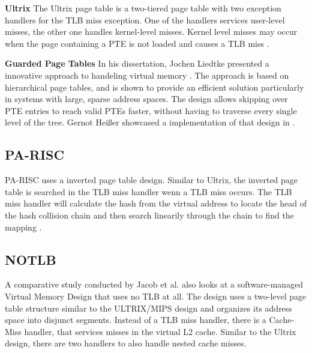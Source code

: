 \textbf{Ultrix} The Ultrix page table is a two-tiered page table with two exception handlers for the TLB miss exception.
One of the handlers services user-level misses, the other one handles kernel-level misses.
Kernel level misses may occur when the page containing a PTE is not loaded and causes a
TLB miss \cite{jacob1998look}.

\textbf{Guarded Page Tables} In his dissertation, Jochen Liedtke presented a innovative approach
to handeling virtual memory \cite{liedtkeGPT}.
The approach is based on hierarchical page tables, and is shown to provide an efficient solution particularly in systems with large, sparse address spaces.
The design allows skipping over PTE entries to reach valid PTEs faster, without having to traverse every single level of the tree.
Gernot Heißer showcased a implementation of that design in \cite{heiserAnatomyHighPerformanceMicrokernel}.

\subsection{PA-RISC}
PA-RISC uses a inverted page table design. Similar to Ultrix, the inverted page table is searched in the TLB miss handler wenn a TLB miss occurs.
The TLB miss handler will calculate the hash from the virtual address to locate the head of the hash collision chain and then search linearily through the chain to find the mapping \cite{jacob1998look}.

\subsection{NOTLB}
A comparative study conducted by Jacob et al. \cite{jacob1998look} also looks at a software-managed Virtual Memory Design that uses no TLB at all.
The design uses a two-level page table structure similar to the ULTRIX/MIPS design and organizes its address space into disjunct segments.
Instead of a TLB miss handler, there is a Cache-Miss handler, that services misses in the virtual L2 cache.
Similar to the Ultrix design, there are two handlers to also handle nested cache misses.










